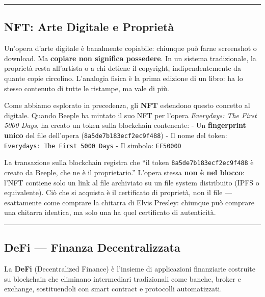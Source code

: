 \documentclass[
  italian,
  openany]{book}
\begin{document}
\begin{center}\rule{0.5\linewidth}{0.5pt}\end{center}

\subsection{NFT: Arte Digitale e
Proprietà}\label{nft-arte-digitale-e-proprietuxe0}

Un'opera d'arte digitale è banalmente copiabile: chiunque può farne
screenshot o download. Ma \textbf{copiare non significa possedere}. In
un sistema tradizionale, la proprietà resta all'artista o a chi detiene
il copyright, indipendentemente da quante copie circolino. L'analogia
fisica è la prima edizione di un libro: ha lo stesso contenuto di tutte
le ristampe, ma vale di più.

Come abbiamo esplorato in precedenza, gli \textbf{NFT} estendono questo
concetto al digitale. Quando Beeple ha mintato il suo NFT per l'opera
\emph{Everydays: The First 5000 Days}, ha creato un token sulla
blockchain contenente: - Un \textbf{fingerprint unico} del file
dell'opera (\texttt{8a5de7b183ecf2ec9f488}) - Il nome del token:
\texttt{Everydays:\ The\ First\ 5000\ Days} - Il simbolo:
\texttt{EF5000D}

La transazione sulla blockchain registra che ``il token
\texttt{8a5de7b183ecf2ec9f488} è creato da Beeple, che ne è il
proprietario.'' L'opera stessa \textbf{non è nel blocco}: l'NFT contiene
solo un link al file archiviato su un file system distribuito (IPFS o
equivalente). Ciò che si acquista è il certificato di proprietà, non il
file --- esattamente come comprare la chitarra di Elvis Presley:
chiunque può comprare una chitarra identica, ma solo una ha quel
certificato di autenticità.

\begin{center}\rule{0.5\linewidth}{0.5pt}\end{center}

\subsection{DeFi --- Finanza
Decentralizzata}\label{defi-finanza-decentralizzata}

La \textbf{DeFi} (Decentralized Finance) è l'insieme di applicazioni
finanziarie costruite su blockchain che eliminano intermediari
tradizionali come banche, broker e exchange, sostituendoli con smart
contract e protocolli automatizzati.
\end{document}
